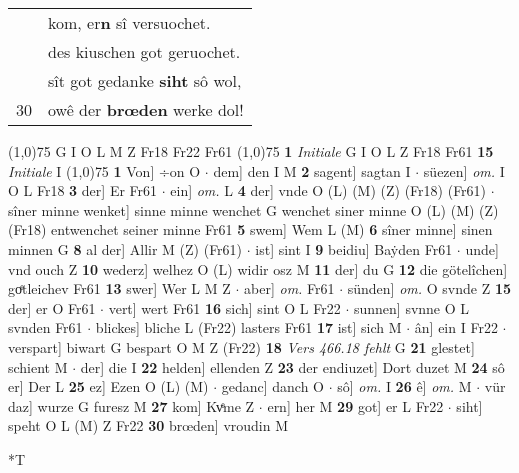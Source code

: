 \documentclass[8pt,a4paper,notitlepage]{article}
\begin{document}
\begin{table}[ht]
\begin{minipage}[t]{0.5\linewidth}
\begin{tabular}{rl}
 & kom, er\textbf{n} sî versuochet.\\ 
 & des kiuschen got geruochet.\\ 
 & sît got gedanke \textbf{siht} sô wol,\\ 
30 & owê der \textbf{brœden} werke dol!\\ 
\end{tabular}
\scriptsize
\line(1,0){75} \newline
G I O L M Z Fr18 Fr22 Fr61 \newline
\line(1,0){75} \newline
\textbf{1} \textit{Initiale} G I O L Z Fr18 Fr61  \textbf{15} \textit{Initiale} I  \newline
\line(1,0){75} \newline
\textbf{1} Von] ÷on O  $\cdot$ dem] den I M \textbf{2} sagent] sagtan I  $\cdot$ süezen] \textit{om.} I O L Fr18 \textbf{3} der] Er Fr61  $\cdot$ ein] \textit{om.} L \textbf{4} der] vnde O (L) (M) (Z) (Fr18) (Fr61)  $\cdot$ sîner minne wenket] sinne minne wenchet G wenchet siner minne O (L) (M) (Z) (Fr18) entwenchet seiner minne Fr61 \textbf{5} swem] Wem L (M) \textbf{6} sîner minne] sinen minnen G \textbf{8} al der] Allir M (Z) (Fr61)  $\cdot$ ist] sint I \textbf{9} beidiu] Baẏden Fr61  $\cdot$ unde] vnd ouch Z \textbf{10} wederz] welhez O (L) widir osz M \textbf{11} der] du G \textbf{12} die götelîchen] goͤtleichev Fr61 \textbf{13} swer] Wer L M Z  $\cdot$ aber] \textit{om.} Fr61  $\cdot$ sünden] \textit{om.} O svnde Z \textbf{15} der] er O Fr61  $\cdot$ vert] wert Fr61 \textbf{16} sich] sint O L Fr22  $\cdot$ sunnen] svnne O L svnden Fr61  $\cdot$ blickes] bliche L (Fr22) lasters Fr61 \textbf{17} ist] sich M  $\cdot$ ân] ein I Fr22  $\cdot$ verspart] biwart G bespart O M Z (Fr22) \textbf{18} \textit{Vers 466.18 fehlt} G  \textbf{21} glestet] schient M  $\cdot$ der] die I \textbf{22} helden] ellenden Z \textbf{23} der endiuzet] Dort duzet M \textbf{24} sô er] Der L \textbf{25} ez] Ezen O (L) (M)  $\cdot$ gedanc] danch O  $\cdot$ sô] \textit{om.} I \textbf{26} ê] \textit{om.} M  $\cdot$ vür daz] wurze G furesz M \textbf{27} kom] Kvͤme Z  $\cdot$ ern] her M \textbf{29} got] er L Fr22  $\cdot$ siht] speht O L (M) Z Fr22 \textbf{30} brœden] vroudin M \newline
\end{minipage}
\hspace{0.5cm}
\begin{minipage}[t]{0.5\linewidth}
\small
\begin{center}*T
\end{center}

\end{minipage}
\end{table}
\end{document}

